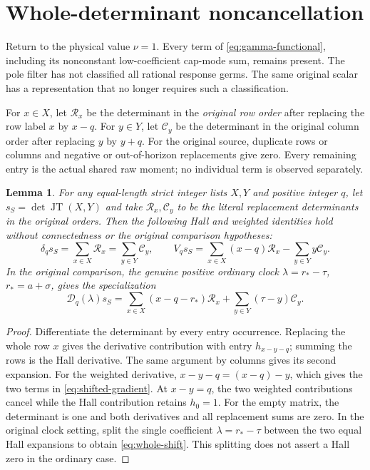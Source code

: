 \documentclass[11pt,a4paper]{amsart}
\numberwithin{equation}{section}
\theoremstyle{plain}
\newtheorem{lemma}[theorem]{Lemma}
\theoremstyle{definition}
\newcommand{\JT}{\operatorname{JT}}
\newcommand{\DD}{\mathscr D}
\begin{document}
\section{Whole-determinant noncancellation}\label{sec:whole-sign}

Return to the physical value \(\nu=1\).  Every term of
\eqref{eq:gamma-functional}, including its nonconstant low-coefficient
cap-mode sum, remains present.  The pole filter has not classified
all rational response germs.  The same original scalar has a representation
that no longer requires such a classification.

For \(x\in X\), let \(\mathcal R_x\) be the determinant in the \emph{original
row order} after replacing the row label \(x\) by \(x-q\).  For \(y\in Y\), let
\(\mathcal C_y\) be the determinant in the original column order after
replacing \(y\) by \(y+q\).  For the original source, duplicate rows or
columns and negative or out-of-horizon replacements give zero.  Every
remaining entry is the actual shared raw moment; no individual term is
observed separately.

\begin{lemma}\label{lem:shifted-gradient}
For any equal-length strict integer lists \(X,Y\) and positive integer
\(q\), let \(s_S=\det\JT(X,Y)\) and take \(\mathcal R_x,\mathcal C_y\)
to be the literal replacement determinants in the original orders.
Then the following Hall and weighted identities hold without
connectedness or the original comparison hypotheses:
\begin{equation}\label{eq:shifted-gradient}
 \delta_q s_S=\sum_{x\in X}\mathcal R_x
             =\sum_{y\in Y}\mathcal C_y,\qquad
 V_qs_S=\sum_{x\in X}(x-q)\mathcal R_x
                   -\sum_{y\in Y}y\mathcal C_y.
\end{equation}
In the original comparison, the genuine positive ordinary clock
\(\lambda=r_*-\tau\), \(r_*=a+\sigma\), gives the specialization
\begin{equation}\label{eq:whole-shift}
 \DD_q(\lambda)s_S
 =\sum_{x\in X}(x-q-r_*)\mathcal R_x
      +\sum_{y\in Y}(\tau-y)\mathcal C_y.
\end{equation}
\end{lemma}
\begin{proof}
Differentiate the determinant by every entry occurrence.  Replacing the
whole row \(x\) gives the derivative contribution with entry
\(h_{x-y-q}\); summing the rows is the Hall derivative.  The same argument
by columns gives its second expansion.  For the weighted derivative,
\(x-y-q=(x-q)-y\), which gives the two terms in
\eqref{eq:shifted-gradient}.  At \(x-y=q\), the two weighted contributions
cancel while the Hall contribution retains \(h_0=1\).
For the empty matrix, the determinant is one and both derivatives and
all replacement sums are zero.  In the original clock setting, split
the single coefficient \(\lambda=r_*-\tau\) between the two equal
Hall expansions to obtain \eqref{eq:whole-shift}.  This splitting does not
assert a Hall zero in the ordinary case.
\end{proof}
\end{document}
